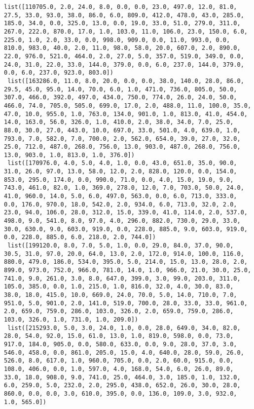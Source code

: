 \documentclass[11pt]{article}
\begin{document}
\begin{Verbatim}[commandchars=\\\{\}]
 list([110705.0, 2.0, 24.0, 8.0, 0.0, 0.0, 23.0, 497.0, 12.0, 81.0, 27.5, 33.0, 93.0, 38.0, 86.0, 6.0, 809.0, 412.0, 478.0, 43.0, 285.0, 185.0, 34.0, 0.0, 325.0, 13.0, 0.0, 19.0, 33.0, 51.0, 279.0, 311.0, 267.0, 222.0, 870.0, 17.0, 1.0, 103.0, 11.0, 106.0, 23.0, 150.0, 6.0, 225.0, 1.0, 2.0, 33.0, 0.0, 998.0, 909.0, 0.0, 11.0, 993.0, 0.0, 810.0, 983.0, 40.0, 2.0, 11.0, 98.0, 58.0, 20.0, 607.0, 2.0, 890.0, 22.0, 976.0, 521.0, 464.0, 2.0, 27.0, 5.0, 357.0, 519.0, 349.0, 0.0, 24.0, 31.0, 22.0, 33.0, 144.0, 379.0, 0.0, 6.0, 237.0, 144.0, 379.0, 0.0, 6.0, 237.0, 923.0, 803.0])
 list([163286.0, 11.0, 8.0, 20.0, 0.0, 0.0, 38.0, 140.0, 28.0, 86.0, 29.5, 45.0, 95.0, 14.0, 70.0, 6.0, 1.0, 471.0, 736.0, 805.0, 50.0, 307.0, 466.0, 392.0, 497.0, 434.0, 750.0, 774.0, 26.0, 24.0, 50.0, 466.0, 74.0, 705.0, 505.0, 699.0, 17.0, 2.0, 488.0, 11.0, 100.0, 35.0, 47.0, 10.0, 955.0, 1.0, 763.0, 134.0, 901.0, 1.0, 813.0, 41.0, 454.0, 14.0, 163.0, 56.0, 326.0, 1.0, 410.0, 2.0, 38.0, 34.0, 7.0, 25.0, 88.0, 30.0, 27.0, 443.0, 10.0, 697.0, 33.0, 501.0, 4.0, 639.0, 1.0, 793.0, 7.0, 582.0, 7.0, 700.0, 2.0, 562.0, 654.0, 39.0, 27.0, 32.0, 25.0, 712.0, 487.0, 268.0, 756.0, 13.0, 903.0, 487.0, 268.0, 756.0, 13.0, 903.0, 1.0, 813.0, 1.0, 376.0])
 list([170976.0, 4.0, 5.0, 4.0, 1.0, 0.0, 43.0, 651.0, 35.0, 90.0, 31.0, 26.0, 97.0, 13.0, 58.0, 12.0, 2.0, 828.0, 120.0, 0.0, 154.0, 853.0, 295.0, 174.0, 0.0, 990.0, 71.0, 0.0, 4.0, 15.0, 19.0, 9.0, 743.0, 461.0, 82.0, 1.0, 369.0, 278.0, 12.0, 7.0, 703.0, 50.0, 24.0, 41.0, 960.0, 14.0, 5.0, 6.0, 497.0, 563.0, 0.0, 6.0, 713.0, 333.0, 0.0, 176.0, 970.0, 18.0, 542.0, 2.0, 934.0, 6.0, 713.0, 32.0, 2.0, 23.0, 94.0, 106.0, 28.0, 312.0, 15.0, 339.0, 41.0, 114.0, 2.0, 537.0, 498.0, 9.0, 541.0, 8.0, 97.0, 4.0, 296.0, 882.0, 730.0, 29.0, 33.0, 30.0, 630.0, 9.0, 603.0, 919.0, 0.0, 228.0, 885.0, 9.0, 603.0, 919.0, 0.0, 228.0, 885.0, 6.0, 218.0, 2.0, 744.0])
 list([199120.0, 8.0, 7.0, 5.0, 1.0, 0.0, 29.0, 84.0, 37.0, 90.0, 30.5, 31.0, 97.0, 20.0, 64.0, 13.0, 2.0, 172.0, 914.0, 100.0, 116.0, 880.0, 479.0, 186.0, 534.0, 395.0, 5.0, 214.0, 15.0, 13.0, 28.0, 2.0, 899.0, 973.0, 752.0, 966.0, 781.0, 14.0, 1.0, 966.0, 21.0, 30.0, 25.0, 741.0, 9.0, 261.0, 3.0, 8.0, 647.0, 399.0, 3.0, 99.0, 203.0, 311.0, 105.0, 385.0, 0.0, 1.0, 215.0, 1.0, 816.0, 32.0, 4.0, 30.0, 83.0, 38.0, 18.0, 415.0, 10.0, 669.0, 24.0, 70.0, 5.0, 14.0, 710.0, 7.0, 951.0, 5.0, 901.0, 2.0, 141.0, 519.0, 700.0, 28.0, 33.0, 33.0, 961.0, 2.0, 659.0, 759.0, 286.0, 103.0, 326.0, 2.0, 659.0, 759.0, 286.0, 103.0, 326.0, 1.0, 731.0, 1.0, 209.0])
 list([215293.0, 5.0, 3.0, 24.0, 1.0, 0.0, 28.0, 649.0, 34.0, 82.0, 28.0, 54.0, 92.0, 15.0, 61.0, 13.0, 1.0, 819.0, 598.0, 0.0, 73.0, 917.0, 184.0, 905.0, 0.0, 580.0, 633.0, 0.0, 9.0, 28.0, 37.0, 3.0, 546.0, 458.0, 0.0, 861.0, 205.0, 15.0, 4.0, 640.0, 28.0, 59.0, 26.0, 526.0, 8.0, 617.0, 1.0, 960.0, 705.0, 0.0, 2.0, 60.0, 915.0, 0.0, 108.0, 406.0, 0.0, 1.0, 597.0, 4.0, 168.0, 54.0, 6.0, 26.0, 89.0, 33.0, 18.0, 908.0, 9.0, 741.0, 25.0, 464.0, 3.0, 185.0, 1.0, 132.0, 6.0, 259.0, 5.0, 232.0, 2.0, 295.0, 438.0, 652.0, 26.0, 30.0, 28.0, 860.0, 0.0, 0.0, 3.0, 610.0, 395.0, 0.0, 136.0, 109.0, 3.0, 932.0, 1.0, 565.0])

\end{Verbatim}
\end{document}
